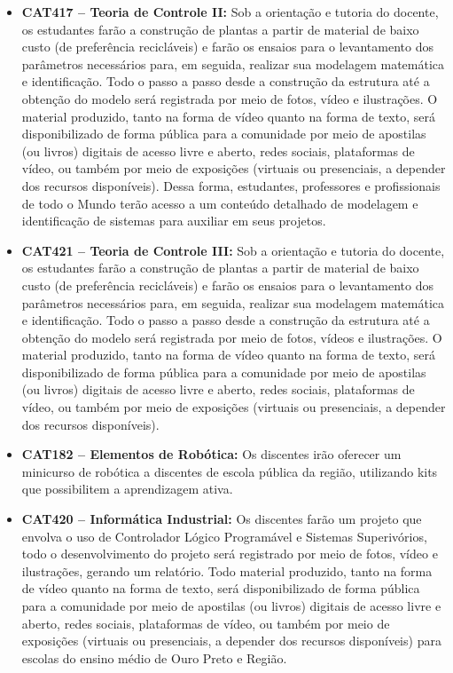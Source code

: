 \documentclass[
	12pt,				%
	openright,			%
	oneside,			%
	a4paper,			%
	english,			%
	brazil				%
	]{abntex2}
\begin{document}
\begin{itemize}
    \item \textbf{CAT417 -- Teoria de Controle II:} Sob a orientação e tutoria do docente, os estudantes farão a construção de plantas a partir de material de baixo custo (de preferência recicláveis) e farão os ensaios para o levantamento dos parâmetros necessários para, em seguida, realizar sua modelagem matemática e identificação. Todo o passo a passo desde a construção da estrutura até a obtenção do modelo será registrada por meio de fotos, vídeo e ilustrações. O material produzido, tanto na forma de vídeo quanto na forma de texto, será disponibilizado de forma pública para a comunidade por meio de apostilas (ou livros) digitais de acesso livre e aberto, redes sociais, plataformas de vídeo, ou também por meio de exposições (virtuais ou presenciais, a depender dos recursos disponíveis). Dessa forma, estudantes, professores e profissionais de todo o Mundo terão acesso a um conteúdo detalhado de modelagem e identificação de sistemas para auxiliar em seus projetos.

    \item \textbf{CAT421 -- Teoria de Controle III:}  Sob a orientação e tutoria do docente, os estudantes farão a construção de plantas a partir de material de baixo custo (de preferência recicláveis) e farão os ensaios para o levantamento dos parâmetros necessários para, em seguida, realizar sua modelagem matemática e identificação. Todo o passo a passo desde a construção da estrutura até a obtenção do modelo será registrada por meio de fotos, vídeos e ilustrações. O material produzido, tanto na forma de vídeo quanto na forma de texto, será disponibilizado de forma pública para a comunidade por meio de apostilas (ou livros) digitais de acesso livre e aberto, redes sociais, plataformas de vídeo, ou também por meio de exposições (virtuais ou presenciais, a depender dos recursos disponíveis).

    \item \textbf{CAT182 -- Elementos de Robótica:} Os discentes irão oferecer um minicurso de robótica a discentes de escola pública da região, utilizando kits que possibilitem a aprendizagem ativa.

    \item \textbf{CAT420 -- Informática Industrial:} Os discentes farão um projeto que envolva o uso de Controlador Lógico Programável e Sistemas Superivórios, todo o desenvolvimento do projeto será registrado por meio de fotos, vídeo e ilustrações, gerando um relatório. Todo material produzido, tanto na forma de vídeo quanto na forma de texto, será disponibilizado de forma pública para a comunidade por meio de apostilas (ou livros) digitais de acesso livre e aberto, redes sociais, plataformas de vídeo, ou também por meio de exposições (virtuais ou presenciais, a depender dos recursos disponíveis) para escolas do ensino médio de Ouro Preto e Região.


\end{itemize}
\end{document}
